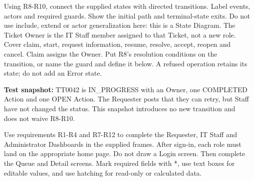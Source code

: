 {Using R8-R10, connect the supplied states with directed transitions. Label events, actors and required guards. Show the initial path and terminal-state exits. Do not use include, extend or actor generalization here: this is a State Diagram.}
{The Ticket Owner is the IT Staff member assigned to that Ticket, not a new role. Cover claim, start, request information, resume, resolve, accept, reopen and cancel. Claim assigns the Owner. Put R8's resolution conditions on the transition, or name the guard and define it below. A refused operation retains its state; do not add an Error state.}
\begin{contenttable}
{\textbf{Test snapshot:} TT0042 is IN\_PROGRESS with an Owner, one COMPLETED Action and one OPEN Action. The Requester posts that they can retry, but Staff have not changed the status. This snapshot introduces no new transition and does not waive R8-R10.}
\end{contenttable}
\examTicketState
{}\blankbox{1.2cm}
\newpage
{Use requirements R1-R4 and R7-R12 to complete the Requester, IT Staff and Administrator Dashboards in the supplied frames. After sign-in, each role must land on the appropriate home page. Do not draw a Login screen. Then complete the Queue and Detail screens. Mark required fields with *, use text boxes for editable values, and use hatching for read-only or calculated data.}
\ticketNotationReference
{}
